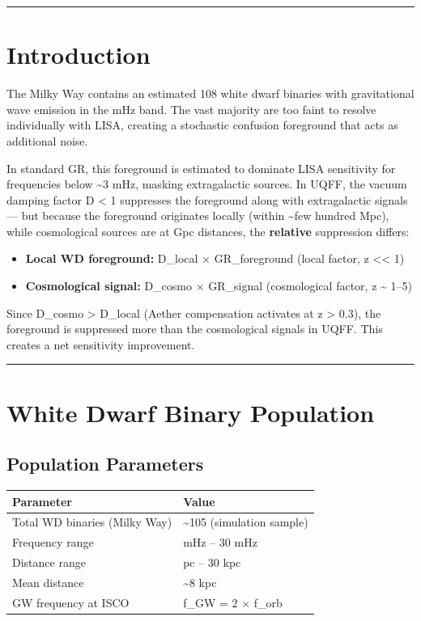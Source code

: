 \documentclass[12pt,a4paper]{article}
\begin{document}
\medskip\hrule\medskip

\section{Introduction}

The Milky Way contains an estimated 108 white dwarf binaries with gravitational wave emission in the mHz band. The vast majority are too faint to resolve individually with LISA, creating a stochastic confusion foreground that acts as additional noise.

In standard GR, this foreground is estimated to dominate LISA sensitivity for frequencies below \textasciitilde{}3 mHz, masking extragalactic sources. In UQFF, the vacuum damping factor D < 1 suppresses the foreground along with extragalactic signals --- but because the foreground originates locally (within \textasciitilde{}few hundred Mpc), while cosmological sources are at Gpc distances, the \textbf{relative} suppression differs:

\begin{itemize}
  \item \textbf{Local WD foreground:} D\_local $\times$ GR\_foreground (local factor, z << 1)
  \item \textbf{Cosmological signal:} D\_cosmo $\times$ GR\_signal (cosmological factor, z \textasciitilde{} 1--5)
\end{itemize}

Since D\_cosmo > D\_local (Aether compensation activates at z > 0.3), the foreground is suppressed more than the cosmological signals in UQFF. This creates a net sensitivity improvement.

\medskip\hrule\medskip

\section{White Dwarf Binary Population}

\subsection{Population Parameters}

\begin{table}[H]
\centering
\small
\begin{tabularx}{\linewidth}{@{}>{\raggedright\arraybackslash}X>{\raggedright\arraybackslash}X@{}}
\toprule
Parameter & Value \tabularnewline
\midrule
Total WD binaries (Milky Way) & \textasciitilde{}105 (simulation sample) \tabularnewline
Frequency range & 0.1 mHz -- 30 mHz \tabularnewline
Distance range & 1 pc -- 30 kpc \tabularnewline
Mean distance & \textasciitilde{}8 kpc \tabularnewline
GW frequency at ISCO & f\_GW = 2 $\times$ f\_orb \tabularnewline
\bottomrule
\end{tabularx}
\end{table}
\end{document}
